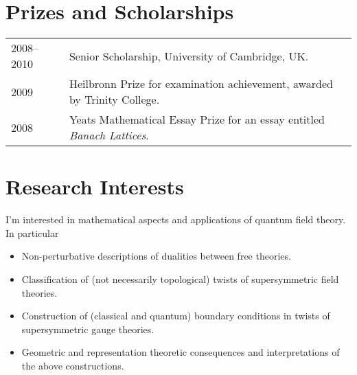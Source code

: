 \documentclass[10pt,oneside]{article}
\newcommand\T{\rule{0pt}{2.6ex}}
\begin{document}

\section*{Prizes and Scholarships}
\begin{tabular}{ll}
 2008--2010 \qquad \qquad \qquad \, \T & Senior Scholarship, University of Cambridge, UK. \\
 2009 \T & Heilbronn Prize for examination achievement, awarded by Trinity College. \\
 2008 \T & Yeats Mathematical Essay Prize for an essay entitled \emph{Banach Lattices}. 
\end{tabular}

\section*{Research Interests}
I'm interested in mathematical aspects and applications of quantum field theory.  In particular
\begin{itemize}
 \item Non-perturbative descriptions of dualities between free theories.
 \item Classification of (not necessarily topological) twists of supersymmetric field theories.
 \item Construction of (classical and quantum) boundary conditions in twists of supersymmetric gauge theories.
 \item Geometric and representation theoretic consequences and interpretations of the above constructions.
\end{itemize}
\end{document}
